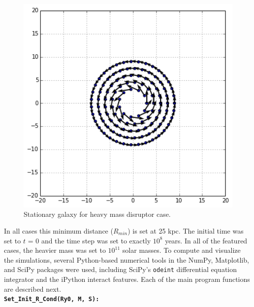 \documentclass[11pt]{article}
\begin{document}
\begin{figure}[h!]
\centering
\includegraphics[width=5in]{HeavyPassageImage.png}
\caption{Stationary galaxy for heavy mass disruptor case.}
\label{starlocheavy_fig}
\end{figure}

In all cases this minimum distance ($R_{min}$) is set at 25 kpc.  The initial time was set to $t$ = 0 and the time step was set to exactly $10^8$ years.  In all of the featured cases, the heavier mass was set to $10^{11}$ solar masses.  To compute and visualize the simulations, several Python-based numerical tools in the NumPy, Matplotlib, and SciPy packages were used, including SciPy's \texttt{odeint} differential equation integrator and the iPython interact features.  Each of the main program functions are described next.\\

\textbf{\texttt{Set\_Init\_R\_Cond(Ry0, M, S):}}
\end{document}
